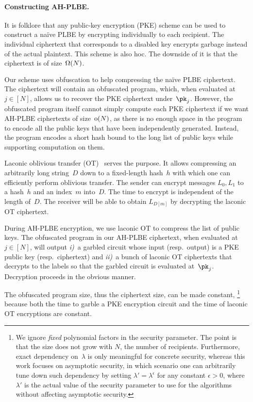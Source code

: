 \paragraph{Constructing AH-PLBE.}
It is folklore that any public-key encryption (PKE) scheme can be used to construct a na{\"i}ve PLBE by encrypting individually to each recipient.
The individual ciphertext that corresponds to a disabled key encrypts garbage instead of the actual plaintext.
This scheme is also \ad hoc.
The downside of it is that the ciphertext is of size~$\operatorname{\Omega}(N)$.

Our scheme uses obfuscation to help compressing the na{\"i}ve PLBE ciphertext.
The ciphertext will contain an obfuscated program, which, when evaluated at~${j\in[N]}$, allows us to recover the PKE ciphertext under~$\pk_j$.
However, the obfuscated program itself cannot simply compute each PKE ciphertext if we want AH-PLBE ciphertexts of size~$\operatorname{o}(N)$, as there is no enough space in the program to encode all the public keys that have been independently generated.
Instead, the program encodes a short hash
bound to the long list of public keys
while supporting computation on them.

Laconic oblivious transfer (OT)~\cite{C:CDGGMP17} serves the purpose.
It allows compressing an arbitrarily long string~$D$ down to a fixed-length hash~$h$ with which one can efficiently perform oblivious transfer.
The sender can encrypt messages $L_0,L_1$ to a hash~$h$ and an index~$m$ into~$D$.
The time to encrypt is independent of the length of~$D$.
The receiver will be able to obtain $L_{D[m]}$ by decrypting the laconic OT ciphertext.

During AH-PLBE encryption, we use laconic OT to compress the list of public keys.
The obfuscated program in our AH-PLBE ciphertext, when evaluated at~${j\in[N]}$, will output
\emph{i)}~a garbled circuit whose input (resp.~output) is a PKE public key (resp.~ciphertext) and
\emph{ii)}~a bunch of laconic OT ciphertexts that decrypts to the labels so that the garbled circuit is evaluated at~$\pk_j$.
Decryption proceeds in the obvious manner.

The obfuscated program size, thus the ciphertext size, can be made constant,%
\footnote{\label{fn:ignore-poly-lambda}%
We ignore \emph{fixed} polynomial factors in the security parameter.
The point is that the size does not grow with $N$, the number of recipients.
Furthermore, exact dependency on~$\lambda$ is
only meaningful for concrete security,
whereas this work focuses on asymptotic security,
in which scenario one can arbitrarily tune down such dependency by setting
${\lambda'=\lambda^\epsilon}$ for any constant ${\epsilon>0}$,
where $\lambda'$ is the actual value of the security parameter
to use for the algorithms without affecting asymptotic security.}
because
both the time to garble a PKE encryption circuit and the time of laconic OT encryptions are constant.
